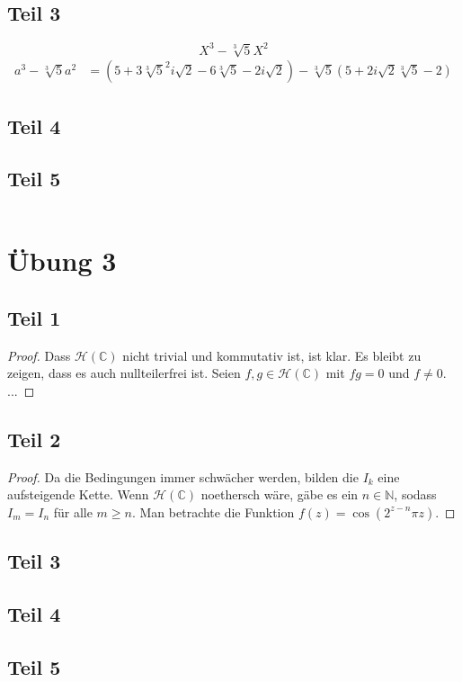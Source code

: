\documentclass[10pt,a4paper]{article}
\begin{document}
\subsection{Teil 3}

\begin{equation}
  X^{3} - \sqrt[3]{5}X^{2}
\end{equation}
\begin{align*}
  a^{3} - \sqrt[3]{5}a^{2} & = (5 + 3\sqrt[3]{5}^{2}i\sqrt{2} - 6\sqrt[3]{5} - 2i\sqrt{2}) - \sqrt[3]{5}(5 + 2i\sqrt{2}\sqrt[3]{5} - 2)
\end{align*}

\subsection{Teil 4}

\subsection{Teil 5}

\begin{equation}

\end{equation}

\section{Übung 3}

\subsection{Teil 1}

\begin{proof}
  Dass $\mathcal{H}(\mathbb{C})$ nicht trivial und kommutativ ist, ist klar.
  Es bleibt zu zeigen, dass es auch nullteilerfrei ist.
  Seien $f, g \in \mathcal{H}(\mathbb{C})$ mit $fg = 0$ und $f \ne 0$.
  ...
\end{proof}

\subsection{Teil 2}

\begin{proof}
  Da die Bedingungen immer schwächer werden, bilden die $I_{k}$ eine aufsteigende Kette.
  Wenn $\mathcal{H}(\mathbb{C})$ noethersch wäre, gäbe es ein $n \in \mathbb{N}$, sodass $I_{m} = I_{n}$ für alle $m \ge n$.
  Man betrachte die Funktion $f(z) = \cos(2^{z - n}\pi z)$.
\end{proof}

\subsection{Teil 3}

\subsection{Teil 4}

\subsection{Teil 5}
\end{document}
